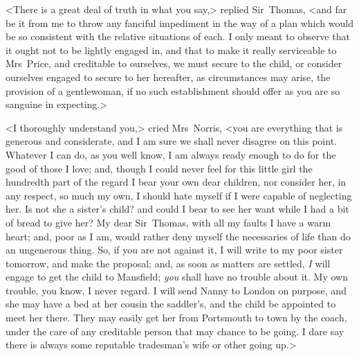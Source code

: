 <There is a great deal of truth in what you say,> replied Sir~Thomas, <and far be it from me to throw any fanciful impediment in the way of a plan which would be so consistent with the relative situations of each. I only meant to observe that it ought not to be lightly engaged in, and that to make it really serviceable to Mrs~Price, and creditable to ourselves, we must secure to the child, or consider ourselves engaged to secure to her hereafter, as circumstances may arise, the provision of a gentlewoman, if no such establishment should offer as you are so sanguine in expecting.>

<I thoroughly understand you,> cried Mrs~Norris, <you are everything that is generous and considerate, and I am sure we shall never disagree on this point. Whatever I can do, as you well know, I am always ready enough to do for the good of those I love; and, though I could never feel for this little girl the hundredth part of the regard I bear your own dear children, nor consider her, in any respect, so much my own, I should hate myself if I were capable of neglecting her. Is not she a sister's child? and could I bear to see her want while I had a bit of bread to give her? My dear Sir~Thomas, with all my faults I have a warm heart; and, poor as I am, would rather deny myself the necessaries of life than do an ungenerous thing. So, if you are not against it, I will write to my poor sister tomorrow, and make the proposal; and, as soon as matters are settled, \textit{I}  will engage to get the child to Mansfield; \textit{you}  shall have no trouble about it. My own trouble, you know, I never regard. I will send Nanny to London on purpose, and she may have a bed at her cousin the saddler's, and the child be appointed to meet her there. They may easily get her from Portsmouth to town by the coach, under the care of any creditable person that may chance to be going. I dare say there is always some reputable tradesman's wife or other going up.>

